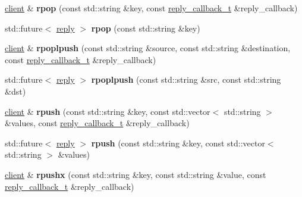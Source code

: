 \begin{DoxyCompactItemize}
\mbox{\label{classcpp__redis_1_1client_aa29c7c00278934074e3cdbf70c0bb9cc}} 
\hyperlink{classcpp__redis_1_1client}{client} \& {\bfseries rpop} (const std\+::string \&key, const \hyperlink{classcpp__redis_1_1client_a061a1140d36d2eaeda82b09a0bb3f9f2}{reply\+\_\+callback\+\_\+t} \&reply\+\_\+callback)
\item 
\mbox{\label{classcpp__redis_1_1client_a7a2ea6e56ce9fa430cfc44ada77d960b}} 
std\+::future$<$ \hyperlink{classcpp__redis_1_1reply}{reply} $>$ {\bfseries rpop} (const std\+::string \&key)
\item 
\mbox{\label{classcpp__redis_1_1client_a1d50b5d26753768d79ebbe04f3615c7a}} 
\hyperlink{classcpp__redis_1_1client}{client} \& {\bfseries rpoplpush} (const std\+::string \&source, const std\+::string \&destination, const \hyperlink{classcpp__redis_1_1client_a061a1140d36d2eaeda82b09a0bb3f9f2}{reply\+\_\+callback\+\_\+t} \&reply\+\_\+callback)
\item 
\mbox{\label{classcpp__redis_1_1client_a4c4fd3342f665a4d902b42b051797e51}} 
std\+::future$<$ \hyperlink{classcpp__redis_1_1reply}{reply} $>$ {\bfseries rpoplpush} (const std\+::string \&src, const std\+::string \&dst)
\item 
\mbox{\label{classcpp__redis_1_1client_a925a0b8ae7864783d9e164776ca07075}} 
\hyperlink{classcpp__redis_1_1client}{client} \& {\bfseries rpush} (const std\+::string \&key, const std\+::vector$<$ std\+::string $>$ \&values, const \hyperlink{classcpp__redis_1_1client_a061a1140d36d2eaeda82b09a0bb3f9f2}{reply\+\_\+callback\+\_\+t} \&reply\+\_\+callback)
\item 
\mbox{\label{classcpp__redis_1_1client_a1e135e9e69a92a0b54059d5f81f9ff25}} 
std\+::future$<$ \hyperlink{classcpp__redis_1_1reply}{reply} $>$ {\bfseries rpush} (const std\+::string \&key, const std\+::vector$<$ std\+::string $>$ \&values)
\item 
\mbox{\label{classcpp__redis_1_1client_a051fdb76cf3d40bd7c0ea0dcb0eed36e}} 
\hyperlink{classcpp__redis_1_1client}{client} \& {\bfseries rpushx} (const std\+::string \&key, const std\+::string \&value, const \hyperlink{classcpp__redis_1_1client_a061a1140d36d2eaeda82b09a0bb3f9f2}{reply\+\_\+callback\+\_\+t} \&reply\+\_\+callback)

\end{DoxyCompactItemize}
